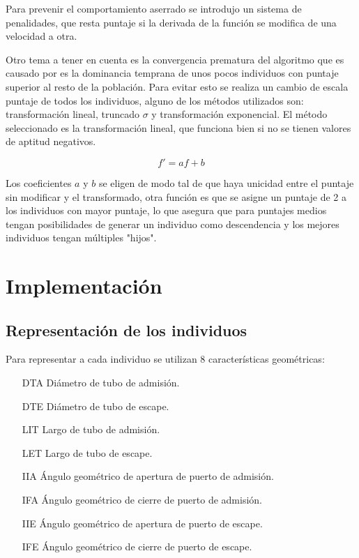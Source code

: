 Para prevenir el comportamiento aserrado se introdujo un sistema de
penalidades, que resta puntaje si la derivada de la función se modifica de una
velocidad a otra.


Otro tema a tener en cuenta es la convergencia prematura del algoritmo que es
causado por es la dominancia temprana de unos pocos individuos con puntaje
superior al resto de la población.
%
Para evitar esto se realiza un cambio de escala puntaje de todos los
individuos, alguno de los métodos utilizados son: transformación lineal,
truncado $\sigma$ y transformación exponencial.
%
El método seleccionado es la transformación lineal, que funciona bien
\cite{goldberg} si no se tienen valores de aptitud negativos.

\begin{equation}
    f' = af + b
\end{equation}

Los coeficientes $a$ y $b$ se eligen de modo tal de que haya unicidad entre el
puntaje sin modificar y el transformado, otra función es que se asigne un
puntaje de 2 a los individuos con mayor puntaje, lo que asegura que para
puntajes medios tengan posibilidades de generar un individuo como descendencia y
los mejores individuos tengan múltiples "hijos".

\section{Implementación}


\subsection{Representación de los individuos}

Para representar a cada individuo se utilizan 8 características geométricas:

\begin{enumerate}
    \item [DTA] Diámetro de tubo de admisión.
    \item [DTE] Diámetro de tubo de escape.
    \item [LIT] Largo de tubo de admisión.
    \item [LET] Largo de tubo de escape.
    \item [IIA] Ángulo geométrico de apertura de puerto de admisión.
    \item [IFA] Ángulo geométrico de cierre de puerto de admisión.
    \item [IIE] Ángulo geométrico de apertura de puerto de escape.
    \item [IFE] Ángulo geométrico de cierre de puerto de escape.
\end{enumerate}

